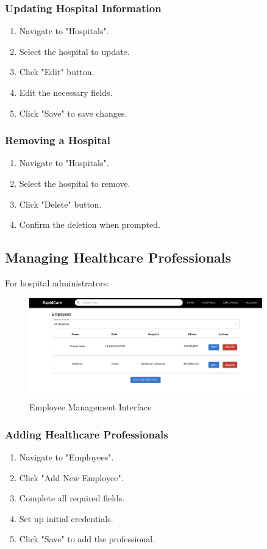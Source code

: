 \documentclass[12pt, titlepage]{article}
\begin{document}
\subsubsection{Updating Hospital Information}
\begin{enumerate}
\item Navigate to "Hospitals".
\item Select the hospital to update.
\item Click "Edit" button.
\item Edit the necessary fields.
\item Click "Save" to save changes.
\end{enumerate}

\subsubsection{Removing a Hospital}
\begin{enumerate}
\item Navigate to "Hospitals".
\item Select the hospital to remove.
\item Click "Delete" button.
\item Confirm the deletion when prompted.
\end{enumerate}

\subsection{Managing Healthcare Professionals}
For hospital administrators:

\begin{figure}[H]
\centering
\includegraphics[width=0.9\textwidth]{employee.png}
\caption{Employee Management Interface}
\label{fig:Employee Management Interface}
\end{figure}

\subsubsection{Adding Healthcare Professionals}
\begin{enumerate}
\item Navigate to "Employees".
\item Click "Add New Employee".
\item Complete all required fields.
\item Set up initial credentials.
\item Click "Save" to add the professional.
\end{enumerate}
\end{document}
